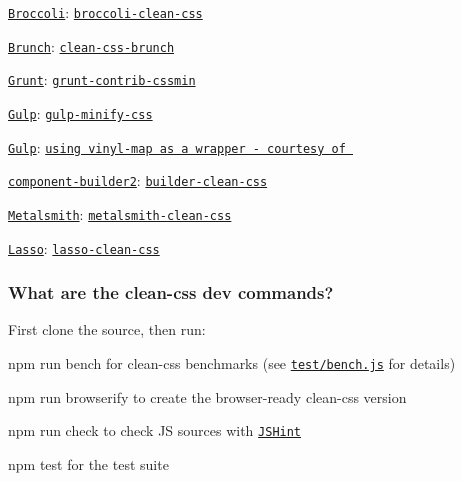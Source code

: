 \begin{DoxyItemize}
\item \href{https://github.com/broccolijs/broccoli#broccoli}{\tt Broccoli}\+: \href{https://github.com/shinnn/broccoli-clean-css}{\tt broccoli-\/clean-\/css}
\item \href{http://brunch.io/}{\tt Brunch}\+: \href{https://github.com/brunch/clean-css-brunch}{\tt clean-\/css-\/brunch}
\item \href{http://gruntjs.com}{\tt Grunt}\+: \href{https://github.com/gruntjs/grunt-contrib-cssmin}{\tt grunt-\/contrib-\/cssmin}
\item \href{http://gulpjs.com/}{\tt Gulp}\+: \href{https://github.com/jonathanepollack/gulp-minify-css}{\tt gulp-\/minify-\/css}
\item \href{http://gulpjs.com/}{\tt Gulp}\+: \href{https://github.com/jakubpawlowicz/clean-css/issues/342}{\tt using vinyl-\/map as a wrapper -\/ courtesy of }
\item \href{https://github.com/component/builder2.js}{\tt component-\/builder2}\+: \href{https://github.com/poying/builder-clean-css}{\tt builder-\/clean-\/css}
\item \href{http://metalsmith.io}{\tt Metalsmith}\+: \href{https://github.com/aymericbeaumet/metalsmith-clean-css}{\tt metalsmith-\/clean-\/css}
\item \href{https://github.com/lasso-js/lasso}{\tt Lasso}\+: \href{https://github.com/yomed/lasso-clean-css}{\tt lasso-\/clean-\/css}
\end{DoxyItemize}

\subsubsection*{What are the clean-\/css\textquotesingle{} dev commands?}

First clone the source, then run\+:


\begin{DoxyItemize}
\item {\ttfamily npm run bench} for clean-\/css benchmarks (see \href{https://github.com/jakubpawlowicz/clean-css/blob/master/test/bench.js}{\tt test/bench.\+js} for details)
\item {\ttfamily npm run browserify} to create the browser-\/ready clean-\/css version
\item {\ttfamily npm run check} to check JS sources with \href{https://github.com/jshint/jshint/}{\tt J\+S\+Hint}
\item {\ttfamily npm test} for the test suite
\end{DoxyItemize}


